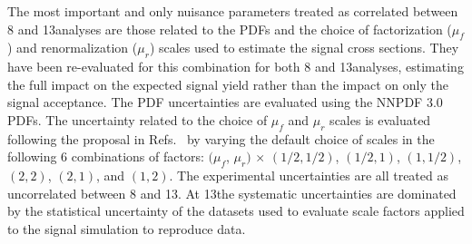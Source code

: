 \begin{table}[htb]
  \centering
  \caption{Correlation of systematic uncertainties in the signal prediction across analyses. A ``yes'' signifies 100\% correlation, and ``no'' means uncorrelated. The asterisk indicates information based on distribution and on yields.}
  \label{tab:correlations}
\end{table}

The most important and only nuisance parameters treated as correlated between 8 and 13\TeV analyses are those related to the PDFs and the choice of factorization ($\mu_{f}$) and renormalization ($\mu_{r}$) scales used to estimate the signal cross sections.
They have been re-evaluated for this combination for both 8 and 13\TeV analyses, estimating the full impact on the expected signal yield rather than the impact on only the signal acceptance.
The PDF uncertainties are evaluated using the NNPDF 3.0~\cite{Ball:2011mu} PDFs.
The uncertainty related to the choice of $\mu_{f}$ and $\mu_{r}$ scales is evaluated following the proposal in Refs.~\cite{Cacciari:2003fi,Catani:2003zt} by varying the default choice of scales in the following 6 combinations of factors:
$(\mu_{f}$, $\mu_{r})$ $\times$ $(1/2, 1/2)$, $(1/2, 1)$, $(1,1/2)$, $(2, 2)$, $(2, 1)$, and $(1, 2)$.
The experimental uncertainties are all treated as uncorrelated between 8 and 13\TeV. At 13\TeV the systematic uncertainties are dominated by the statistical uncertainty of the datasets used to evaluate scale factors applied to the signal simulation to reproduce data.

